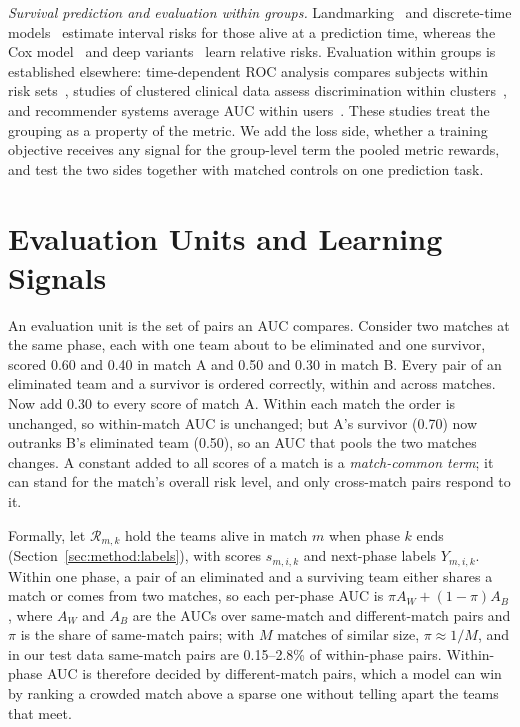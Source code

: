 \documentclass[sigconf,anonymous]{acmart}
\begin{document}
\emph{Survival prediction and evaluation within groups.} Landmarking~\cite{vanHouwelingen07} and discrete-time models~\cite{SingerWillett93,Gensheimer19} estimate interval risks for those alive at a prediction time, whereas the Cox model~\cite{Cox72} and deep variants~\cite{DeepHit18,DynamicDeepHit20} learn relative risks. Evaluation within groups is established elsewhere: time-dependent ROC analysis compares subjects within risk sets~\cite{HeagertyZheng05}, studies of clustered clinical data assess discrimination within clusters~\cite{vanKlaveren14}, and recommender systems average AUC within users~\cite{Zhou18}. These studies treat the grouping as a property of the metric. We add the loss side, whether a training objective receives any signal for the group-level term the pooled metric rewards, and test the two sides together with matched controls on one prediction task.

\section{Evaluation Units and Learning Signals}
\label{sec:account}
An evaluation unit is the set of pairs an AUC compares. Consider two matches at the same phase, each with one team about to be eliminated and one survivor, scored 0.60 and 0.40 in match A and 0.50 and 0.30 in match B. Every pair of an eliminated team and a survivor is ordered correctly, within and across matches. Now add 0.30 to every score of match A. Within each match the order is unchanged, so within-match AUC is unchanged; but A's survivor (0.70) now outranks B's eliminated team (0.50), so an AUC that pools the two matches changes. A constant added to all scores of a match is a \emph{match-common term}; it can stand for the match's overall risk level, and only cross-match pairs respond to it.

Formally, let $\mathcal{R}_{m,k}$ hold the teams alive in match $m$ when phase $k$ ends (Section~\ref{sec:method:labels}), with scores $s_{m,i,k}$ and next-phase labels $Y_{m,i,k}$. Within one phase, a pair of an eliminated and a surviving team either shares a match or comes from two matches, so each per-phase AUC is $\pi A_W+(1-\pi)A_B$, where $A_W$ and $A_B$ are the AUCs over same-match and different-match pairs and $\pi$ is the share of same-match pairs; with $M$ matches of similar size, $\pi\approx1/M$, and in our test data same-match pairs are 0.15--2.8\% of within-phase pairs. Within-phase AUC is therefore decided by different-match pairs, which a model can win by ranking a crowded match above a sparse one without telling apart the teams that meet.
\end{document}
